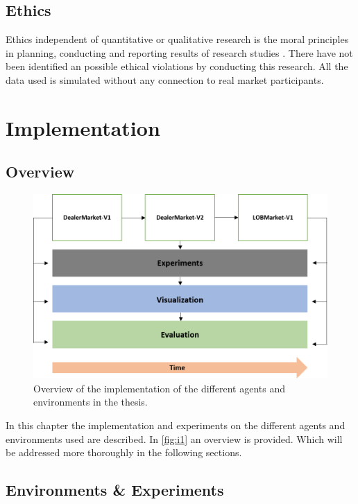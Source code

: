 \documentclass{kththesis}
\theoremstyle{definition}
\begin{document}
\section{Ethics}
Ethics independent of quantitative or qualitative research is the moral principles in planning, conducting and reporting results of research studies \parencite{haakansson2013portal}. There have not been identified an possible ethical violations by conducting this research. All the data used is simulated without any connection to real market participants.

\chapter{Implementation}\label{ch:5}

\section{Overview}
\begin{figure}[H]
    \centering
    \includegraphics[scale=.7]{Imgs/implementation.png}
    \caption{Overview of the implementation of the different agents and environments in the thesis.}
    \label{fig:i1}
\end{figure}
In this chapter the implementation and experiments on the different agents and environments used are described. In \autoref{fig:i1} an overview is provided. Which will be addressed more thoroughly in the following sections.

\section{Environments \& Experiments}
\end{document}
